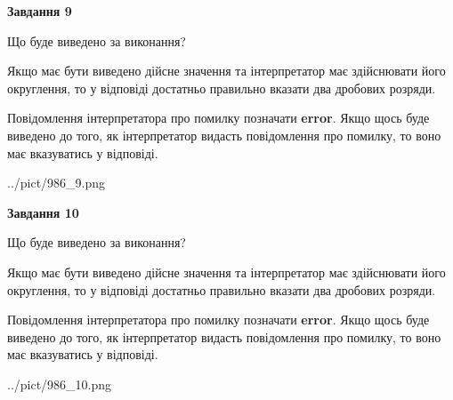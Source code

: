 \documentclass[12pt, ukrainian]{article}
\begin{document}
{\begin {Large}
{\begin {center}\textbf{Завдання 9}\end {center}}\par
Що буде виведено за виконання? \par

Якщо має бути виведено дійсне значення та інтерпретатор має здійснювати його округлення, 
то у відповіді достатньо правильно вказати два дробових розряди.

Повідомлення інтерпретатора про помилку позначати \textbf{error}.
Якщо щось буде виведено до того, як інтерпретатор видасть повідомлення про помилку, 
то воно має вказуватись у відповіді. \par

\begin{center}
	{../pict/986_9.png}
\end{center}
\newpage

{\begin {center}\textbf{Завдання 10}\end {center}}\par
Що буде виведено за виконання? \par

Якщо має бути виведено дійсне значення та інтерпретатор має здійснювати його округлення, 
то у відповіді достатньо правильно вказати два дробових розряди.

Повідомлення інтерпретатора про помилку позначати \textbf{error}.
Якщо щось буде виведено до того, як інтерпретатор видасть повідомлення про помилку, 
то воно має вказуватись у відповіді. \par

\begin{center}
	{../pict/986_10.png}
\end{center}
\newpage

\end {Large}}
\end{document}
